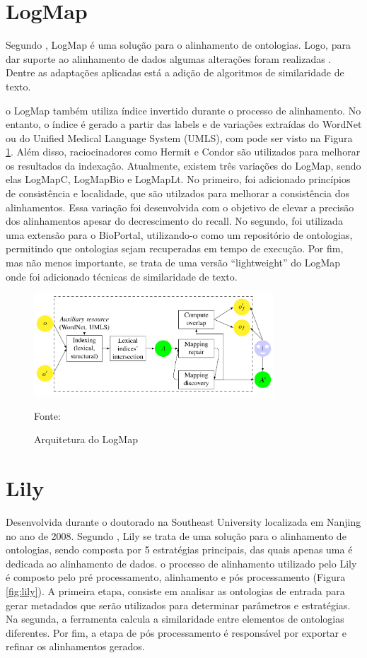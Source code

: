 \section{LogMap}
Segundo , LogMap é uma solução para o alinhamento de ontologias. Logo, para dar suporte ao alinhamento de dados algumas alterações foram realizadas \cite{jimenez2015logmap}. Dentre as adaptações aplicadas está a adição de algoritmos de similaridade de texto.

o LogMap também utiliza índice invertido durante o processo de alinhamento. No entanto, o índice é gerado a partir das labels e de variações extraídas do WordNet ou do Unified Medical Language System (UMLS), com pode ser visto na Figura \ref{fig:logmap}. Além disso, raciocinadores como Hermit e Condor são utilizados para melhorar os resultados da indexação. 
Atualmente, existem três variações do LogMap, sendo elas LogMapC, LogMapBio e LogMapLt.  No primeiro, foi adicionado princípios de consistência e localidade, que são utilzados para melhorar a consistência dos alinhamentos. Essa variação foi desenvolvida com o objetivo de elevar a precisão dos alinhamentos apesar do decrescimento do recall. No segundo, foi utilizada uma extensão para o BioPortal, utilizando-o como um repositório de ontologias, permitindo que ontologias sejam recuperadas em tempo de execução. Por fim, mas não menos importante, se trata de uma versão “lightweight” do LogMap onde foi adicionado técnicas de similaridade de texto.

\begin{figure}[!ht]
	\centering
	\includegraphics[width=0.8\textwidth]{./imagens/logmap.png}
    \caption{Arquitetura do LogMap}
	\footnotesize{Fonte: \cite{euzenat2013d}}
	\label{fig:logmap}
\end{figure}

\section{Lily}
Desenvolvida durante o doutorado na Southeast University localizada em Nanjing no ano de 2008. Segundo  , Lily se trata de uma solução para o alinhamento de ontologias, sendo composta por 5 estratégias principais, das quais apenas uma é dedicada ao alinhamento de dados.
o processo de alinhamento utilizado pelo Lily é composto pelo pré processamento, alinhamento e pós processamento (Figura \ref{fig:lily}).  A primeira etapa, consiste em analisar as ontologias de entrada para gerar metadados que serão utilizados para determinar parâmetros e estratégias. Na segunda, a ferramenta calcula a similaridade entre elementos de ontologias diferentes. Por fim, a etapa de pós processamento é responsável por exportar e refinar os alinhamentos gerados.

